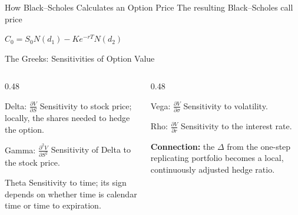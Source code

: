 \documentclass[aspectratio=169,10pt]{beamer}
\begin{document}
\begin{frame}{How Black--Scholes Calculates an Option Price}
  \centering The resulting Black--Scholes call price
  \begin{center}
    \Large $\displaystyle \boxed{C_0=S_0N(d_1)-Ke^{-rT}N(d_2)}$
  \end{center}
\end{frame}

\begin{frame}{The Greeks: Sensitivities of Option Value}
  \small
  \begin{columns}[T,onlytextwidth]
    \begin{column}{0.48\textwidth}
      \begin{block}{Delta: $\frac{\partial V}{\partial S}$}
        Sensitivity to stock price; locally, the shares needed to hedge the option.
      \end{block}
      \begin{block}{Gamma: $\frac{\partial^2 V}{\partial S^2}$}
        Sensitivity of Delta to the stock price.
      \end{block}
      \begin{block}{Theta}
        Sensitivity to time; its sign depends on whether time is calendar time or time to expiration.
      \end{block}
    \end{column}
    \begin{column}{0.48\textwidth}
      \begin{block}{Vega: $\frac{\partial V}{\partial \sigma}$}
        Sensitivity to volatility.
      \end{block}
      \begin{block}{Rho: $\frac{\partial V}{\partial r}$}
        Sensitivity to the interest rate.
      \end{block}
      \vspace{0.25cm}
      \textbf{Connection:} the $\Delta$ from the one-step replicating portfolio becomes a local, continuously adjusted hedge ratio.
    \end{column}
  \end{columns}
\end{frame}
\end{document}
